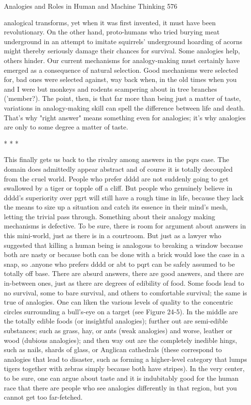 Analogies and Roles in Human and Machine Thinking                                   576

analogical transforms, yet when it was first invented, it must have been revolutionary.
On the other hand, proto-humans who tried burying meat underground in an attempt
to imitate squirrels' underground hoarding of acorns might thereby seriously damage
their chances for survival. Some analogies help, others hinder.
        Our current mechanisms for analogy-making must certainly have emerged as a
consequence of natural selection. Good mechanisms were selected for, bad ones were
selected against, way back when, in the old times when you and I were but monkeys
and rodents scampering about in tree branches ('member?). The point, then, is that far
more than being just a matter of taste, variations in analogy-making skill can spell the
difference between life and death. That's why "right answer" means something even
for analogies; it's why analogies are only to some degree a matter of taste.

                                       *   *   *

        This finally gets us back to the rivalry among answers in the pqrs case. The
domain does admittedly appear abstract and of course it is totally decoupled from the
cruel world. People who prefer dddd are not suddenly going to get swallowed by a
tiger or topple off a cliff. But people who genuinely believe in dddd's superiority over
pgrt will still have a rough time in life, because they lack the means to size up a
situation and catch its essence in their mind's mesh, letting the trivial pass through.
Something about their analogy making mechanisms is defective.
        To be sure, there is room for argument about answers in this mini-world, just
as there is in a courtroom. But just as a lawyer who suggested that killing a human
being is analogous to breaking a window because both are nasty or because both can
be done with a brick would lose the case in a snap, so .anyone who prefers dddd or abt
to pqrt can be safely assumed to be totally off base. There are absurd answers, there
are good answers, and there are in-between ones, just as there are degrees of edibility
of food. Some foods lead to no survival, some to bare survival, and others to
comfortable survival; the same is true of analogies.
        One can liken the various levels of quality to the concentric circles
surrounding a bull's-eye on a target (see Figure 24-5). In the middle are the totally
edible foods (or insightful analogies); further out are semi-edible substances; such as
grass, hay, or ants (weak analogies) and worse, leather or wood (dubious analogies);
and then way out are the completely inedible hings, such as nails, shards of glass, or
Anglican cathedrals (these correspond to analogies that lead to disaster, such as
forming a higher-level category that lumps tigers together with zebras simply because
both have stripes). In the very center, to be sure, one can argue about taste and it is
indubitably good for the human race that there are people who see analogies
differently in that region, but you cannot get too far-fetched.




